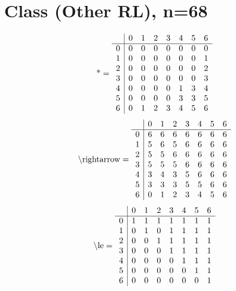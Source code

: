 \documentclass[11pt]{article}
\begin{document}
\section{Class (Other RL), n=68}
\[\text{*} = 
\begin{array}{r | r r r r r r r}
 & 0 & 1 & 2 & 3 & 4 & 5 & 6 \\ \hline
0 & 0 & 0 & 0 & 0 & 0 & 0 & 0 \\
1 & 0 & 0 & 0 & 0 & 0 & 0 & 1 \\
2 & 0 & 0 & 0 & 0 & 0 & 0 & 2 \\
3 & 0 & 0 & 0 & 0 & 0 & 0 & 3 \\
4 & 0 & 0 & 0 & 0 & 1 & 3 & 4 \\
5 & 0 & 0 & 0 & 0 & 3 & 3 & 5 \\
6 & 0 & 1 & 2 & 3 & 4 & 5 & 6 \\
\end{array}
\]
\[\text{\textbackslash rightarrow} = 
\begin{array}{r | r r r r r r r}
 & 0 & 1 & 2 & 3 & 4 & 5 & 6 \\ \hline
0 & 6 & 6 & 6 & 6 & 6 & 6 & 6 \\
1 & 5 & 6 & 5 & 6 & 6 & 6 & 6 \\
2 & 5 & 5 & 6 & 6 & 6 & 6 & 6 \\
3 & 5 & 5 & 5 & 6 & 6 & 6 & 6 \\
4 & 3 & 4 & 3 & 5 & 6 & 6 & 6 \\
5 & 3 & 3 & 3 & 5 & 5 & 6 & 6 \\
6 & 0 & 1 & 2 & 3 & 4 & 5 & 6 \\
\end{array}
\]
\[\text{\textbackslash le} = 
\begin{array}{r | r r r r r r r}
 & 0 & 1 & 2 & 3 & 4 & 5 & 6 \\ \hline
0 & 1 & 1 & 1 & 1 & 1 & 1 & 1 \\
1 & 0 & 1 & 0 & 1 & 1 & 1 & 1 \\
2 & 0 & 0 & 1 & 1 & 1 & 1 & 1 \\
3 & 0 & 0 & 0 & 1 & 1 & 1 & 1 \\
4 & 0 & 0 & 0 & 0 & 1 & 1 & 1 \\
5 & 0 & 0 & 0 & 0 & 0 & 1 & 1 \\
6 & 0 & 0 & 0 & 0 & 0 & 0 & 1 \\
\end{array}
\]
\end{document}

